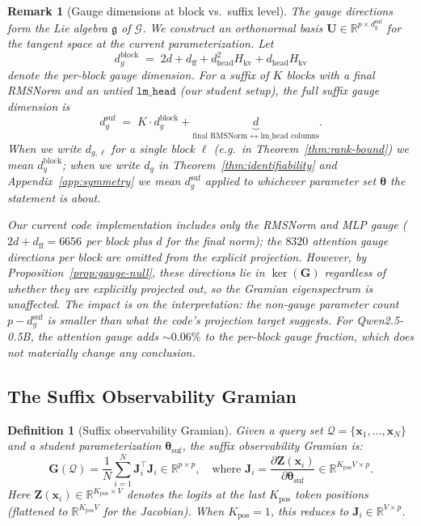 \documentclass{article}
\newtheorem{definition}[theorem]{Definition}
\newtheorem{remark}[theorem]{Remark}
\newcommand{\R}{\mathbb{R}}
\newcommand{\cQ}{\mathcal{Q}}
\newcommand{\cG}{\mathcal{G}}
\newcommand{\btheta}{\boldsymbol{\theta}}
\newcommand{\bx}{\mathbf{x}}
\newcommand{\bJ}{\mathbf{J}}
\newcommand{\bG}{\mathbf{G}}
\newcommand{\bU}{\mathbf{U}}
\newcommand{\bZ}{\mathbf{Z}}
\begin{document}
\begin{remark}[Gauge dimensions at block vs.\ suffix level]
\label{rem:gauge-dims}
The gauge directions form the Lie algebra $\mathfrak{g}$ of $\cG$. We construct an orthonormal basis $\bU \in \R^{p \times d_g^{\text{suf}}}$ for the tangent space at the current parameterization. Let
\[
d_g^{\text{block}} \;=\; 2d + d_\text{ff} + d_\text{head}^2 H_{\text{kv}} + d_\text{head} H_{\text{kv}}
\]
denote the per-block gauge dimension. For a suffix of $K$ blocks with a final RMSNorm and an \emph{untied} $\texttt{lm\_head}$ (our student setup), the full suffix gauge dimension is
\[
d_g^{\text{suf}} \;=\; K \cdot d_g^{\text{block}} + \underbrace{d}_{\text{final RMSNorm $\leftrightarrow$ lm\_head columns}}.
\]
When we write $d_{g,\ell}$ for a single block $\ell$ (e.g.\ in Theorem~\ref{thm:rank-bound}) we mean $d_g^{\text{block}}$; when we write $d_g$ in Theorem~\ref{thm:identifiability} and Appendix~\ref{app:symmetry} we mean $d_g^{\text{suf}}$ applied to whichever parameter set $\btheta$ the statement is about.

Our current code implementation includes only the RMSNorm and MLP gauge ($2d + d_\text{ff} = 6656$ per block plus $d$ for the final norm); the $8320$ attention gauge directions per block are omitted from the explicit projection.  However, by Proposition~\ref{prop:gauge-null}, these directions lie in $\ker(\bG)$ regardless of whether they are explicitly projected out, so the Gramian eigenspectrum is unaffected.  The impact is on the \emph{interpretation}: the non-gauge parameter count $p - d_g^{\text{suf}}$ is smaller than what the code's projection target suggests.  For Qwen2.5-0.5B, the attention gauge adds $\sim 0.06\%$ to the per-block gauge fraction, which does not materially change any conclusion.
\end{remark}

\subsection{The Suffix Observability Gramian}
\label{sec:gramian-theory}

\begin{definition}[Suffix observability Gramian]
\label{def:gramian}
Given a query set $\cQ = \{\bx_1, \ldots, \bx_N\}$ and a student parameterization $\btheta_{\text{suf}}$, the suffix observability Gramian is:
\begin{equation}\label{eq:gramian}
    \bG(\cQ) = \frac{1}{N}\sum_{i=1}^{N} \bJ_i^\top \bJ_i \in \R^{p \times p},
    \quad \text{where } \bJ_i = \frac{\partial \bZ(\bx_i)}{\partial \btheta_{\text{suf}}} \in \R^{K_\text{pos} V \times p}.
\end{equation}
Here $\bZ(\bx_i) \in \R^{K_\text{pos} \times V}$ denotes the logits at the last $K_\text{pos}$ token positions (flattened to $\R^{K_\text{pos} V}$ for the Jacobian).  When $K_\text{pos} = 1$, this reduces to $\bJ_i \in \R^{V \times p}$.
\end{definition}
\end{document}

